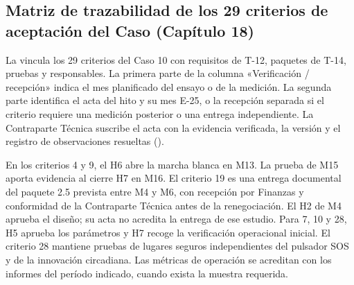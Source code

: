 \subsection*{Matriz de trazabilidad de los 29 criterios de aceptación del Caso (Capítulo 18)}\label{sec:9-rtm-29}

La  vincula los 29 criterios del Caso 10 con requisitos de T-12, paquetes de T-14, pruebas y responsables. La primera parte de la columna «Verificación / recepción» indica el mes planificado del ensayo o de la medición. La segunda parte identifica el acta del hito y su mes E-25, o la recepción separada si el criterio requiere una medición posterior o una entrega independiente. La Contraparte Técnica suscribe el acta con la evidencia verificada, la versión y el registro de observaciones resueltas ().

En los criterios 4 y 9, el H6 abre la marcha blanca en M13. La prueba de M15 aporta evidencia al cierre H7 en M16. El criterio 19 es una entrega documental del paquete 2.5 prevista entre M4 y M6, con recepción por Finanzas y conformidad de la Contraparte Técnica antes de la renegociación. El H2 de M4 aprueba el diseño; su acta no acredita la entrega de ese estudio. Para 7, 10 y 28, H5 aprueba los parámetros y H7 recoge la verificación operacional inicial. El criterio 28 mantiene pruebas de lugares seguros independientes del pulsador SOS y de la innovación circadiana. Las métricas de operación se acreditan con los informes del período indicado, cuando exista la muestra requerida.

